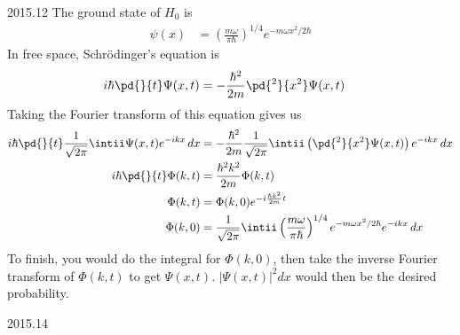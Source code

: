 \documentclass[12pt]{article}
\begin{document}
\begin{solution}{2015.12}
The ground state of $H_0$ is
\begin{align*}
\psi(x) & = \left( \frac{m\omega}{\pi \hbar} \right)^{1/4} e^{-m\omega x^2/2\hbar}
\end{align*}
In free space, Schr\"{o}dinger's equation is
\begin{align*}
i\hbar \pd{}{t} \Psi(x, t) & = -\frac{\hbar^2}{2m} \pd{^2}{x^2} \Psi(x,t)
\end{align*}
Taking the Fourier transform of this equation gives us
\begin{align*}
i\hbar \pd{}{t} \frac{1}{\sqrt{2\pi}} \intii \Psi(x, t) e^{-ikx} \, dx
& = -\frac{\hbar^2}{2m} \frac{1}{\sqrt{2\pi}} \intii \left( \pd{^2}{x^2} \Psi(x, t) \right) e^{-ikx} \, dx \\
i\hbar \pd{}{t} \Phi(k, t) & = \frac{\hbar^2 k^2}{2m} \Phi(k, t) \\
\Phi(k, t) & = \Phi(k, 0) e^{-i\frac{\hbar k^2}{2m} t} \\
\Phi(k, 0) & = \frac{1}{\sqrt{2\pi}} \intii \left( \frac{m\omega}{\pi \hbar} \right)^{1/4} e^{-m\omega x^2/2\hbar} e^{-ikx} \, dx
\end{align*}
To finish, you would do the integral for $\Phi(k, 0)$, then take the inverse Fourier transform of $\Phi(k, t)$ to get $\Psi(x, t)$.
$\left| \Psi(x, t) \right|^2 dx$ would then be the desired probability.
\end{solution}




\begin{solution}{2015.14}
\end{solution}
\end{document}
